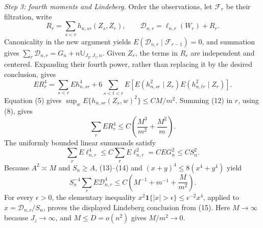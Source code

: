 \emph{Step 3: fourth moments and Lindeberg.}
Order the observations, let \(\mathcal F_r\) be their filtration, write
\[
R_r=\sum_{s<r}h_{n,sr}(Z_s,Z_r),
\qquad \mathcal D_{n,r}=\ell_{n,r}(W_r)+R_r.
\]
Canonicality in the new argument yields
\(E(\mathcal D_{n,r}\mid\mathcal F_{r-1})=0\), and summation gives \(\sum_r\mathcal D_{n,r}=G_n+n\mathbb U_{J_y,J_z,n}\).  Given \(Z_r\), the terms in \(R_r\) are independent and centered.  Expanding their fourth power, rather than replacing it by the desired conclusion, gives
\[
ER_r^4
=\sum_{s<r}Eh_{n,sr}^4
+6\sum_{s<t<r}E\!\left[E(h_{n,sr}^2\mid Z_r)
E(h_{n,tr}^2\mid Z_r)\right].                                \tag{12}
\]
Equation (5) gives
\(\sup_w E\{h_{n,sr}(Z_s,w)^2\}\le CM/m^2\).  Summing (12) in \(r\), using (8), gives
\[
\sum_rER_r^4\le C\left(\frac{M^3}{m^2}+\frac{M^2}{m}\right).\tag{13}
\]
The uniformly bounded linear summands satisfy
\[
\sum_rE\ell_{n,r}^4
\le C\sum_rE\ell_{n,r}^2
=CEG_n^2\le CS_n^2.                                           \tag{14}
\]
Because \(A^2\asymp M\) and \(S_n\ge A\), (13)--(14) and
\((x+y)^4\le8(x^4+y^4)\) yield
\[
S_n^{-4}\sum_rE\mathcal D_{n,r}^4
\le C\left(M^{-1}+m^{-1}+\frac{M}{m^2}\right).               \tag{15}
\]
For every \(\epsilon>0\), the elementary inequality
\(x^2\mathbf 1\{|x|>\epsilon\}\le\epsilon^{-2}x^4\), applied to \(x=\mathcal D_{n,r}/S_n\), proves the displayed Lindeberg conclusion from (15).  Here \(M\to\infty\) because \(J_z\to\infty\), and \(M\le D=o(n^2)\) gives \(M/m^2\to0\).

